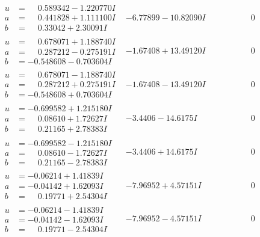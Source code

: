 \documentclass[1p]{elsarticle_modified}
\theoremstyle{definition}
\begin{document}
$$\begin{array}{c|c|c}
\begin{aligned}
u &= \phantom{-}0.589342 - 1.220770 I \\
a &= \phantom{-}0.441828 + 1.111100 I \\
b &= \phantom{-}0.33042 + 2.30091 I\end{aligned}
 & -6.77899 - 10.82090 I & \phantom{-0.000000 } 0 \\ \hline\begin{aligned}
u &= \phantom{-}0.678071 + 1.188740 I \\
a &= \phantom{-}0.287212 - 0.275191 I \\
b &= -0.548608 - 0.703604 I\end{aligned}
 & -1.67408 + 13.49120 I & \phantom{-0.000000 } 0 \\ \hline\begin{aligned}
u &= \phantom{-}0.678071 - 1.188740 I \\
a &= \phantom{-}0.287212 + 0.275191 I \\
b &= -0.548608 + 0.703604 I\end{aligned}
 & -1.67408 - 13.49120 I & \phantom{-0.000000 } 0 \\ \hline\begin{aligned}
u &= -0.699582 + 1.215180 I \\
a &= \phantom{-}0.08610 + 1.72627 I \\
b &= \phantom{-}0.21165 + 2.78383 I\end{aligned}
 & -3.4406 - 14.6175 I & \phantom{-0.000000 } 0 \\ \hline\begin{aligned}
u &= -0.699582 - 1.215180 I \\
a &= \phantom{-}0.08610 - 1.72627 I \\
b &= \phantom{-}0.21165 - 2.78383 I\end{aligned}
 & -3.4406 + 14.6175 I & \phantom{-0.000000 } 0 \\ \hline\begin{aligned}
u &= -0.06214 + 1.41839 I \\
a &= -0.04142 + 1.62093 I \\
b &= \phantom{-}0.19771 + 2.54304 I\end{aligned}
 & -7.96952 + 4.57151 I & \phantom{-0.000000 } 0 \\ \hline\begin{aligned}
u &= -0.06214 - 1.41839 I \\
a &= -0.04142 - 1.62093 I \\
b &= \phantom{-}0.19771 - 2.54304 I\end{aligned}
 & -7.96952 - 4.57151 I & \phantom{-0.000000 } 0 \\ \hline\begin{aligned}

\end{aligned}
\end{array}$$
\end{document}
